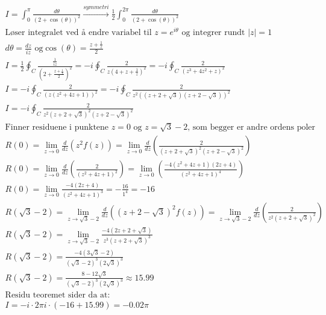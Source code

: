 \documentclass[11pt, A4paper,norsk]{article}
\begin{document}
				\begin{gather*}
I = \int_{0}^{\pi} \frac{d\theta}{(2 + \cos(\theta))^2} \xrightarrow{symmetri} \frac{1}{2} \int_{0}^{2 \pi} \frac{d\theta}{(2 + \cos(\theta))^2} \\
\text{Løser integralet ved å endre variabel til $z = e^{i\theta}$ og integrer rundt $|z| = 1$} \\
d\theta = \frac{dz}{iz} \text{ og} \cos(\theta) = \frac{z + \frac{1}{z}}{2} \\
I = \frac{1}{2} \oint_C \frac{\frac{1}{iz}}{\left( 2 + \frac{z + \frac{1}{z}}{2} \right)^2} = - i \oint_C \frac{2}{z \left( 4 + z + \frac{1}{z} \right)^2} = - i \oint_C \frac{2}{( z^3 + 4z^2 + z )^2} \\
I = - i \oint_C \frac{2}{( z( z^2 + 4z + 1 ) )^2} = - i \oint_C \frac{2}{z^2( ( z + 2 + \sqrt{3} )( z + 2 - \sqrt{3} ) )^2} \\
I = - i \oint_C \frac{2}{z^2( z + 2 + \sqrt{3} )^2 ( z + 2 - \sqrt{3} )^2} \\
\text{Finner residuene i punktene $z = 0$ og $z = \sqrt{3} - 2$, som begger er andre ordens poler} \\
R(0) = \lim_{z \rightarrow 0}\frac{d}{dz}\left( z^2 f(z) \right) = \lim_{z \rightarrow 0}\frac{d}{dz}\left( \frac{2}{( z + 2 + \sqrt{3} )^2 ( z + 2 - \sqrt{3} )^2} \right) \\
R(0) = \lim_{z \rightarrow 0} \frac{d}{dz} \left( \frac{2}{( z^2 + 4z + 1 )^2} \right) = \lim_{z \rightarrow 0} \left( \frac{-4( z^2 + 4z + 1 ) (2z + 4 )}{( z^2 + 4z + 1 )^4} \right) \\
R(0) =  \lim_{z \rightarrow 0} \frac{- 4( 2z + 4 )}{( z^2 + 4z + 1 )^3} = - \frac{16}{1^4} = -16 \\
R\left( \sqrt{3} - 2 \right) = \lim_{z \rightarrow \sqrt{3} - 2} \frac{d}{dz}\left( ( z + 2 - \sqrt{3} )^2 f(z) \right) = \lim_{z \rightarrow \sqrt{3} - 2} \frac{d}{dz}\left( \frac{2}{z^2 ( z + 2 + \sqrt{3} )^2} \right) \\
R\left( \sqrt{3} - 2 \right) = \lim_{z \rightarrow \sqrt{3} - 2} \frac{-4( 2z + 2 + \sqrt{3} )}{z^3 ( z + 2 + \sqrt{3} )^3} \\
R\left( \sqrt{3} - 2 \right) = \frac{-4( 3\sqrt{3} - 2 )}{( \sqrt{3} - 2 )^3 ( 2\sqrt{3} )^3} \\
R\left( \sqrt{3} - 2 \right) = \frac{8 - 12\sqrt{3}}{( \sqrt{3} - 2 )^3 ( 2\sqrt{3} )^3} \approx 15.99 \\
\text{Residu teoremet sider da at:} \\
I = - i \cdot 2 \pi i \cdot (-16 + 15.99) = - 0.02 \pi
				\end{gather*}
\end{document}

